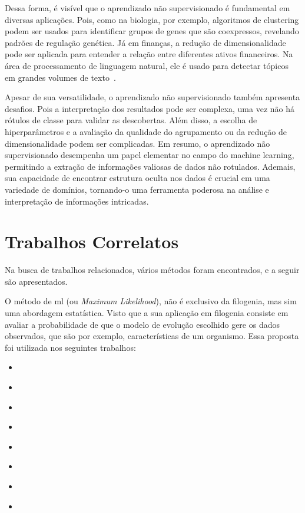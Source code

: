 Dessa forma, é visível que o aprendizado não supervisionado é fundamental em diversas aplicações. Pois, como na biologia, por exemplo, algoritmos de clustering podem ser usados para identificar grupos de genes que são coexpressos, revelando padrões de regulação genética. Já em finanças, a redução de dimensionalidade pode ser aplicada para entender a relação entre diferentes ativos financeiros. Na área de processamento de linguagem natural, ele é usado para detectar tópicos em grandes volumes de texto~\cite{bioinformatics_david_2004}.


Apesar de sua versatilidade, o aprendizado não supervisionado também apresenta desafios. Pois a interpretação dos resultados pode ser complexa, uma vez não há rótulos de classe para validar as descobertas. Além disso, a escolha de hiperparâmetros e a avaliação da qualidade do agrupamento ou da redução de dimensionalidade podem ser complicadas.
Em resumo, o aprendizado não supervisionado desempenha um papel elementar no campo do machine learning, permitindo a extração de informações valiosas de dados não rotulados. Ademais, sua capacidade de encontrar estrutura oculta nos dados é crucial em uma variedade de domínios, tornando-o uma ferramenta poderosa na análise e interpretação de informações intricadas\cite{learning_kernels_scholkopf_2002}.

\section{Trabalhos Correlatos}

Na busca de trabalhos relacionados, vários métodos foram encontrados, e a seguir são apresentados.

O método de \gls{ml} (ou \textit{Maximum Likelihood}), não é exclusivo da filogenia, mas sim uma abordagem estatística. Visto que a sua aplicação em filogenia consiste em avaliar a probabilidade de que o modelo de evolução escolhido gere os dados observados, que são por exemplo, características de um organismo. Essa proposta foi utilizada nos seguintes trabalhos:
\begin{itemize}
  \item \textit{\citeauthor{behl_threat_2022}}
  \item \textit{\citeauthor{fall_genetic_diversity_2021}}
  \item \textit{\citeauthor{shabbir_comprehensive_2020}}
  \item \textit{\citeauthor{hudu_hepatitis_2018}}
  \item \textit{\citeauthor{sallard_tracing_2021}}
  \item \textit{\citeauthor{paez-espino_diversity_evolution_2019}}
  \item \textit{\citeauthor{tang_evolutionary_2021}}
  \item \textit{\citeauthor{cho_analysis_2022}}
\end{itemize}

